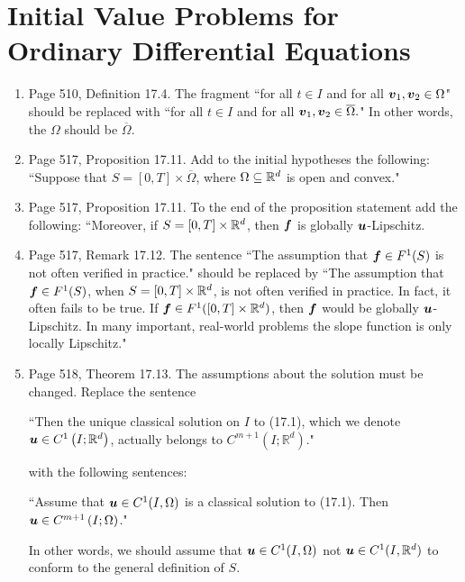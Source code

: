 \documentclass{book}
\begin{document}
\chapter{Initial Value Problems for Ordinary Differential Equations}

	\begin{enumerate}
	\item
Page 510, Definition 17.4. The fragment ``for all $t\in I$ and for all $\boldsymbol{v}_1, \boldsymbol{v}_2\in \Omega$" should be replaced with  ``for all $t\in I$ and for all $\boldsymbol{v}_1, \boldsymbol{v}_2\in \overline{\Omega}.$" In other words, the $\Omega$ should be $\overline{\Omega}$.

	\item
Page 517, Proposition 17.11. Add to the initial hypotheses the following: ``Suppose that $S = [0,T]\times \overline\Omega$, where $\Omega \subseteq\mathbb R^d$ is open and convex."

	\item
Page 517, Proposition 17.11. To the end of the proposition statement add the following: ``Moreover, if $S = [0,T]\times \mathbb R^d$, then $\boldsymbol{f}$ is globally $\boldsymbol{u}$-Lipschitz.

	\item
Page 517, Remark 17.12. The sentence ``The assumption that $\boldsymbol{f}\in F^1(S)$ is not often verified in practice." should be replaced by ``The assumption that $\boldsymbol{f}\in F^1(S)$, when $S = [0,T] \times \mathbb R^d$, is not often verified in practice. In fact, it often fails to be true. If $\boldsymbol{f}\in F^1([0,T]\times \mathbb R^d)$, then $\boldsymbol{f}$ would be globally $\boldsymbol{u}$-Lipschitz. In many important, real-world problems the slope function is only locally Lipschitz." 

	\item
Page 518, Theorem 17.13. The assumptions about the solution must be changed. Replace the sentence 

	\medskip

\hspace{0.5in}``Then the unique classical solution on $I$ to (17.1), which we denote $\boldsymbol{u}\in C^1\left(I;\mathbb{R}^d\right)$, actually belongs to $C^{m+1}\left(I;\mathbb{R}^d\right)$."

	\medskip

with the following sentences:

	\medskip

\hspace{0.5in}``Assume that $\boldsymbol{u}\in C^1(I,\Omega)$ is a classical solution to (17.1). Then $\boldsymbol{u} \in C^{m+1}\left(I;\Omega\right)$."

	\medskip

In other words, we should assume that $\boldsymbol{u}\in C^1(I,\Omega)$ not $\boldsymbol{u} \in  C^1(I,\mathbb R^d)$ to conform to the general definition of $S$.


	\end{enumerate}
	
\end{document}
